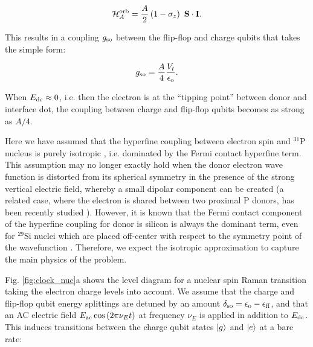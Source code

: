 \documentclass[
 aps,prb,twocolumn,
 amsmath,amssymb,superscriptaddress,
] {revtex4-1}
\begin{document}
\begin{equation} \label{eq:H_A}
\mathcal{H}_{A}^{\rm orb}=\frac{A}{2}\left(1 - \sigma_z\right)~{\bf S\cdot I}.
\end{equation}

This results in a coupling $g_{\rm so}$ between the flip-flop and charge qubits that takes the simple form:

\begin{equation} \label{eq:g_so}
g_{\rm so}=\frac{A}{4}\frac{V_t}{\epsilon_{\rm o}}.
\end{equation}

When $E_{\rm dc} \approx 0$, i.e. then the electron is at the ``tipping point'' between donor and interface dot, the coupling between charge and flip-flop qubits becomes as strong as $A/4$. 

Here we have assumed that the hyperfine coupling between electron spin and $^{31}$P nucleus is purely isotropic \cite{Feher1959}, i.e. dominated by the Fermi contact hyperfine term. This assumption may no longer exactly hold when the donor electron wave function is distorted from its spherical symmetry in the presence of the strong vertical electric field, whereby a small dipolar component can be created (a related case, where the electron is shared between two proximal P donors, has been recently studied \cite{Hile2018}). However, it is known that the Fermi contact component of the hyperfine coupling for donor is silicon is always the dominant term, even for $^{29}$Si nuclei which are placed off-center with respect to the symmetry point of the wavefunction \cite{Ivey1975}. Therefore, we expect the isotropic approximation to capture the main physics of the problem.

Fig. \ref{fig:clock_nuc}a shows the level diagram for a nuclear spin Raman transition taking the electron charge levels into account. We assume that the charge and flip-flop qubit energy splittings are detuned by an amount $\delta_{\rm so} = \epsilon_{\rm o} - \epsilon_{\rm ff}$, and that an AC electric field $E_{\rm ac}\cos{(2\pi\nu_Et)}$ at frequency $\nu_E$ is applied in addition to $E_{\rm dc}$. This induces transitions between the charge qubit states $\ket{g}$ and $\ket{e}$ at a bare rate:
\end{document}
